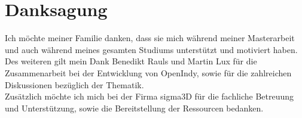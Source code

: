 \chapter*{Danksagung}

\begin{center}
Ich möchte meiner Familie danken, dass sie mich während meiner Masterarbeit und auch während meines gesamten Studiums unterstützt und motiviert haben.\\

Des weiteren gilt mein Dank Benedikt Rauls und Martin Lux für die Zusammenarbeit bei der Entwicklung von OpenIndy, sowie für die zahlreichen Diskussionen bezüglich der Thematik.\\

Zusätzlich möchte ich mich bei der Firma sigma3D für die fachliche Betreuung und Unterstützung, sowie die Bereitstellung der Ressourcen bedanken.
\end{center}

